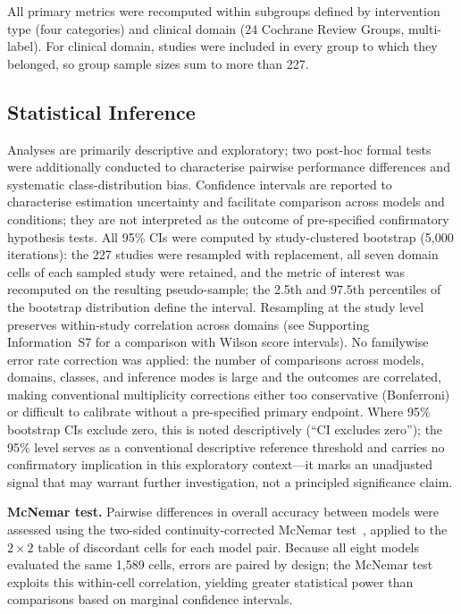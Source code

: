 \documentclass[../main.tex]{subfiles}
\begin{document}
All primary metrics were recomputed within subgroups defined by intervention type
(four categories) and clinical domain (24 Cochrane Review Groups, multi-label).
For clinical domain, studies were included in every group to which they belonged,
so group sample sizes sum to more than 227.

\subsection{Statistical Inference}
\label{sec:methods-inference-stats}
Analyses are primarily descriptive and exploratory; two post-hoc formal tests were additionally conducted to characterise pairwise performance differences and systematic class-distribution bias.
Confidence intervals are reported to characterise estimation uncertainty and
facilitate comparison across models and conditions; they are not interpreted
as the outcome of pre-specified confirmatory hypothesis tests.
All 95\% CIs were computed by study-clustered bootstrap (5{,}000 iterations):
the 227 studies were resampled with replacement, all seven domain cells of each
sampled study were retained, and the metric of interest was recomputed on the
resulting pseudo-sample; the 2.5th and 97.5th percentiles of the bootstrap
distribution define the interval.
Resampling at the study level preserves within-study correlation across domains
(see Supporting Information~S7 for a comparison with Wilson score intervals).
No familywise error rate correction was applied: the number of comparisons
across models, domains, classes, and inference modes is large and the outcomes
are correlated, making conventional multiplicity corrections either too
conservative (Bonferroni) or difficult to calibrate without a pre-specified
primary endpoint.
Where 95\% bootstrap CIs exclude zero, this is noted descriptively
(``CI excludes zero''); the 95\% level serves as a conventional descriptive
reference threshold and carries no confirmatory implication in this exploratory
context---it marks an unadjusted signal that may warrant further investigation,
not a principled significance claim.

\textbf{McNemar test.}
Pairwise differences in overall accuracy between models were assessed using the
two-sided continuity-corrected McNemar test~\citep{McNemar1947}, applied to the
$2{\times}2$ table of discordant cells for each model pair.
Because all eight models evaluated the same 1{,}589 cells, errors are paired by
design; the McNemar test exploits this within-cell correlation, yielding greater
statistical power than comparisons based on marginal confidence intervals.
\end{document}
